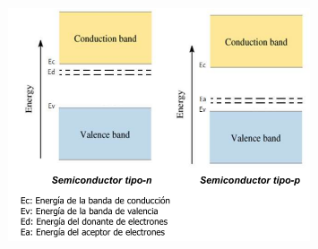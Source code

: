         \saltoPag{}
        \begin{center} \includegraphics[width=8cm]{./imagenes/tiposSemiconductores1.png} \end{center}
        


    


